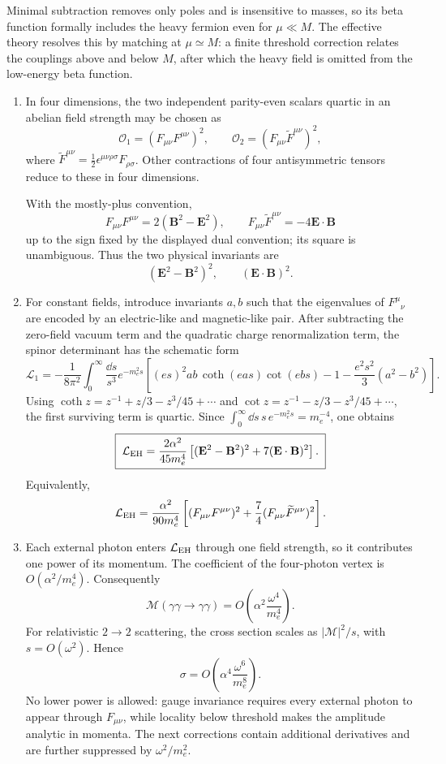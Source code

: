 \begin{enumerate}
\begin{enumerate}
Minimal subtraction removes only poles and is insensitive to masses, so its
beta function formally includes the heavy fermion even for \(\mu\ll M\).
The effective theory resolves this by matching at \(\mu\simeq M\): a finite
threshold correction relates the couplings above and below \(M\), after
which the heavy field is omitted from the low-energy beta function.
\end{enumerate}

\begin{enumerate}
\item
In four dimensions, the two independent parity-even scalars quartic in an
abelian field strength may be chosen as
\[
 \mathcal O_1=(F_{\mu\nu}F^{\mu\nu})^2,\qquad
 \mathcal O_2=(F_{\mu\nu}\widetilde F^{\mu\nu})^2,
\]
where
\(\widetilde F^{\mu\nu}=\tfrac12\epsilon^{\mu\nu\rho\sigma}F_{\rho\sigma}\).
Other contractions of four antisymmetric tensors reduce to these in four
dimensions.

With the mostly-plus convention,
\[
 F_{\mu\nu}F^{\mu\nu}=2(\mathbf B^2-\mathbf E^2),\qquad
 F_{\mu\nu}\widetilde F^{\mu\nu}=-4\mathbf E\cdot\mathbf B
\]
up to the sign fixed by the displayed dual convention; its square is
unambiguous.  Thus the two physical invariants are
\[
 (\mathbf E^2-\mathbf B^2)^2,\qquad
 (\mathbf E\cdot\mathbf B)^2.
\]
\item
For constant fields, introduce invariants \(a,b\) such that the eigenvalues
of \(F^\mu{}_\nu\) are encoded by an electric-like and magnetic-like pair.
After subtracting the zero-field vacuum term and the quadratic charge
renormalization term, the spinor determinant has the schematic form
\[
 \mathcal L_1=-\frac1{8\pi^2}\int_0^\infty\frac{\dd s}{s^3}e^{-m_e^2s}
 \left[(es)^2ab\,\coth(eas)\cot(ebs)-1
 -\frac{e^2s^2}{3}(a^2-b^2)\right].
\]
Using
\(\coth z=z^{-1}+z/3-z^3/45+\cdots\) and
\(\cot z=z^{-1}-z/3-z^3/45+\cdots\), the first surviving term is quartic.
Since \(\int_0^\infty \dd s\,s\,e^{-m_e^2s}=m_e^{-4}\), one obtains
\[
 \boxed{\;
 \mathcal L_{\rm EH}
 =\frac{2\alpha^2}{45m_e^4}
 \left[(\mathbf E^2-\mathbf B^2)^2
 +7(\mathbf E\cdot\mathbf B)^2\right].
 \;}
\]
Equivalently,
\[
 \mathcal L_{\rm EH}
 =\frac{\alpha^2}{90m_e^4}
 \left[(F_{\mu\nu}F^{\mu\nu})^2
 +\frac74(F_{\mu\nu}\widetilde F^{\mu\nu})^2\right].
\]
\item
Each external photon enters \(\mathcal L_{\rm EH}\) through one field
strength, so it contributes one power of its momentum.  The coefficient of
the four-photon vertex is \(O(\alpha^2/m_e^4)\).  Consequently
\[
 \boxed{\mathcal M(\gamma\gamma\to\gamma\gamma)
 =O\left(\alpha^2\frac{\omega^4}{m_e^4}\right).}
\]
For relativistic \(2\to2\) scattering, the cross section scales as
\(\lvert\mathcal M\rvert^2/s\), with \(s=O(\omega^2)\).  Hence
\[
 \boxed{\sigma=O\left(
 \alpha^4\frac{\omega^6}{m_e^8}\right).}
\]
No lower power is allowed: gauge invariance requires every external photon
to appear through \(F_{\mu\nu}\), while locality below threshold makes the
amplitude analytic in momenta.  The next corrections contain additional
derivatives and are further suppressed by \(\omega^2/m_e^2\).
\end{enumerate}


\end{enumerate}
